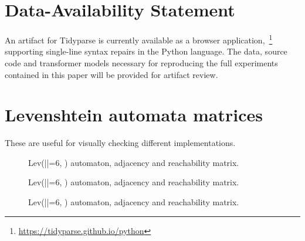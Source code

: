 \documentclass[sigplan,review,acmsmall,nonacm,screen,anonymous]{acmart}\settopmatter{printfolios=false,printccs=false,printacmref=false}
\begin{document}
\section*{Data-Availability Statement}

An artifact for Tidyparse is currently available as a browser application,~\footnote{\url{https://tidyparse.github.io/python}} supporting single-line syntax repairs in the Python language. The data, source code and transformer models necessary for reproducing the full experiments contained in this paper will be provided for artifact review.

\clearpage\vspace{-1cm}

\pagebreak\appendix

\section{Levenshtein automata matrices}

These are useful for visually checking different implementations.

\begin{figure}[H]
\begin{center}
\end{center}
\caption{Lev(|\sigma|=6, ) automaton, adjacency and reachability matrix.}
\end{figure}

\begin{figure}[H]
\begin{center}
\end{center}
\caption{Lev(|\sigma|=6, ) automaton, adjacency and reachability matrix.}
\end{figure}

\begin{figure}[H]
\begin{center}
\end{center}
\caption{Lev(|\sigma|=6, ) automaton, adjacency and reachability matrix.}
\end{figure}
\end{document}
